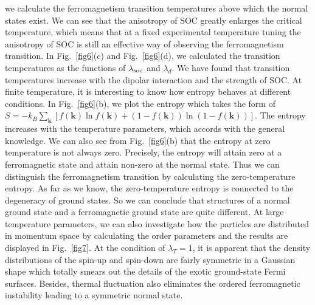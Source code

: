 \documentclass[twocolumn,english,pra,superscriptaddress]{revtex4-1}
\begin{document}
we calculate the ferromagnetism transition temperatures above which the normal states exist. We can see that the anisotropy of SOC greatly enlarges the critical temperature, which means that at a fixed experimental temperature tuning the anisotropy of SOC is still an effective way of observing the ferromagnetism transition. In Fig.~\ref{fig6}(c) and Fig.~\ref{fig6}(d), we calculated the transition temperatures as the functions of $\lambda_{\rm soc}$ and $\lambda_d$. We have found that transition temperatures increase with the dipolar interaction and the strength of SOC. At finite temperature, it is interesting to know how entropy behaves at different conditions. In Fig.~\ref{fig6}(b), we plot the entropy which takes the form of $S=-k_{B}\sum_{\mathbf{k}} \left[f(\mathbf{k})\ln f(\mathbf{k})
+(1-f(\mathbf{k}))\ln(1-f(\mathbf{k}))\right]$. The entropy increases with the temperature parameters, which accords with the general knowledge. We can also see from Fig.~\ref{fig6}(b) that the entropy at zero temperature is not always zero. Precisely, the entropy will attain zero at a ferromagnetic state and attain non-zero at the normal state. Thus we can distinguish the ferromagnetism transition by calculating the zero-temperature entropy. As far as we know, the zero-temperature entropy is connected to the degeneracy of ground states. So we can conclude that structures of a normal ground state and a ferromagnetic ground state are quite different. At large temperature parameters, we can also investigate how the particles are distributed in momentum space by calculating the order parameters and the results are displayed in Fig.~\ref{fig7}. At the condition of $\lambda_{T}=1$, it is apparent that the density distributions of the spin-up and spin-down are fairly symmetric in a Gaussian shape which totally smears out the details of the exotic ground-state Fermi surfaces. Besides, thermal fluctuation also eliminates the ordered ferromagnetic instability leading to a symmetric normal state.\par
\end{document}
